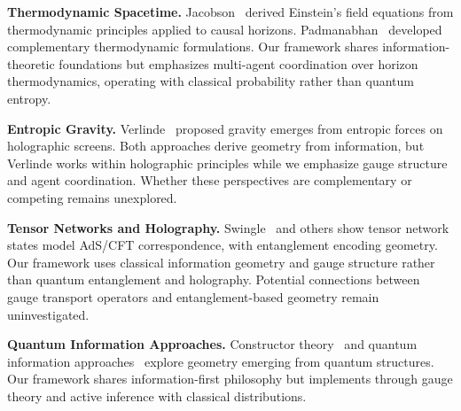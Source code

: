 \documentclass[11pt]{article}
\begin{document}
\textbf{Thermodynamic Spacetime.} Jacobson~\cite{Jacobson1995} derived Einstein's field equations from thermodynamic principles applied to causal horizons. Padmanabhan~\cite{Padmanabhan2010} developed complementary thermodynamic formulations. Our framework shares information-theoretic foundations but emphasizes multi-agent coordination over horizon thermodynamics, operating with classical probability rather than quantum entropy.

\textbf{Entropic Gravity.} Verlinde~\cite{Verlinde2011} proposed gravity emerges from entropic forces on holographic screens. Both approaches derive geometry from information, but Verlinde works within holographic principles while we emphasize gauge structure and agent coordination. Whether these perspectives are complementary or competing remains unexplored.

\textbf{Tensor Networks and Holography.} Swingle~\cite{Swingle2012} and others show tensor network states model AdS/CFT correspondence, with entanglement encoding geometry. Our framework uses classical information geometry and gauge structure rather than quantum entanglement and holography. Potential connections between gauge transport operators and entanglement-based geometry remain uninvestigated.

\textbf{Quantum Information Approaches.} Constructor theory~\cite{Deutsch2015} and quantum information approaches~\cite{Cao2017} explore geometry emerging from quantum structures. Our framework shares information-first philosophy but implements through gauge theory and active inference with classical distributions.
\end{document}
